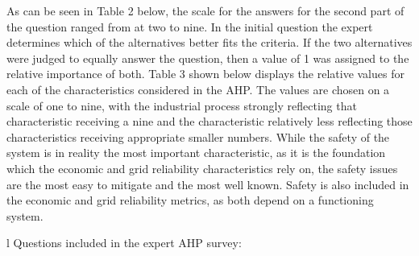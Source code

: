 \documentclass[12pt]{UIdahoMastersThesis}
\begin{document}
As can be seen in Table 2 below, the scale for the answers for the second part of the question ranged from at two to  nine.  In the initial question the expert determines which of the alternatives better fits the criteria.  If the two alternatives were judged to equally answer the question, then a value of 1 was assigned to the relative importance of both. Table 3 shown below displays the relative values for each of the characteristics considered in the AHP. The values are chosen on a scale of one to nine, with the industrial process strongly reflecting that characteristic receiving a nine and the characteristic relatively less reflecting those characteristics receiving appropriate smaller numbers. While the safety of the system is in reality the most important characteristic, as it is the foundation which the economic and grid reliability characteristics rely on, the safety issues are the most easy to mitigate and the most well known. Safety is also included in the economic and grid reliability metrics, as both depend on a functioning system.

\begin{table}[h!]
\centering
\caption{Example of questions given in the Expert AHP survey}
\label{my-label}
\begin{tabular}{l}
Questions included in the expert AHP survey:                                                                                   \\ \hline
{} \\ \hline
\end{tabular}
\end{table}
\end{document}
